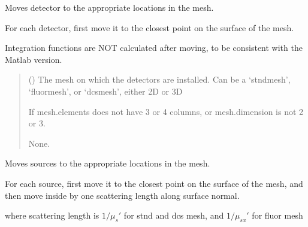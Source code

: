 \documentclass[letterpaper,10pt,english]{sphinxmanual}
\begin{document}
\begin{fulllineitems}
\begin{fulllineitems}
\label{\detokenize{_autosummary/nirfasterff.base.optodes.optode:nirfasterff.base.optodes.optode.move_detectors}}
\pysigstartsignatures
{}
\pysigstopsignatures
\sphinxAtStartPar
Moves detector to the appropriate locations in the mesh.

\sphinxAtStartPar
For each detector, first move it to the closest point on the surface of the mesh.

\sphinxAtStartPar
Integration functions are NOT calculated after moving, to be consistent with the Matlab version.
\begin{quote}\begin{description}
\sphinxAtStartPar
{} () \textendash{} The mesh on which the detectors are installed. Can be a ‘stndmesh’, ‘fluormesh’, or ‘dcsmesh’, either 2D or 3D

\sphinxAtStartPar
{} \textendash{} If mesh.elements does not have 3 or 4 columns, or mesh.dimension is not 2 or 3.

\sphinxAtStartPar
None.

\end{description}\end{quote}

\end{fulllineitems}


\begin{fulllineitems}
\label{\detokenize{_autosummary/nirfasterff.base.optodes.optode:nirfasterff.base.optodes.optode.move_sources}}
\pysigstartsignatures
{}
\pysigstopsignatures
\sphinxAtStartPar
Moves sources to the appropriate locations in the mesh.

\sphinxAtStartPar
For each source, first move it to the closest point on the surface of the mesh, and then move inside by one scattering length along surface normal.

\sphinxAtStartPar
where scattering length is \(1/\mu_s'\) for stnd and dcs mesh, and \(1/\mu_{sx}'\) for fluor mesh


\end{fulllineitems}
\end{fulllineitems}
\end{document}
